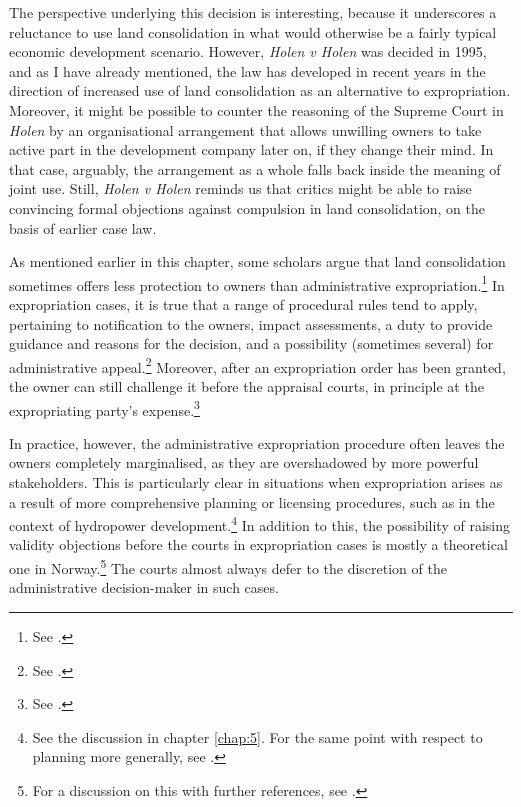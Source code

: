 The perspective underlying this decision is interesting, because it underscores a reluctance to use land consolidation in what would otherwise be a fairly typical economic development scenario. However, {\it Holen v Holen} was decided in 1995, and as I have already mentioned, the law has developed in recent years in the direction of increased use of land consolidation as an alternative to expropriation. Moreover, it might be possible to counter the reasoning of the Supreme Court in {\it Holen} by an organisational arrangement that allows unwilling owners to take active part in the development company later on, if they change their mind. In that case, arguably, the arrangement as a whole falls back inside the meaning of joint use. Still, {\it Holen v Holen} reminds us that critics might be able to raise convincing formal objections against compulsion in land consolidation, on the basis of earlier case law. 

As mentioned earlier in this chapter, some scholars argue that land consolidation sometimes offers less protection to owners than administrative expropriation.\footnote{See \cite[318-319]{stenseth07}.} In expropriation cases, it is true that a range of procedural rules tend to apply, pertaining to notification to the owners, impact assessments, a duty to provide guidance and reasons for the decision, and a possibility (sometimes several) for administrative appeal.\footnote{See \cite[377-382]{dyrkolbotn15b}.} Moreover, after an expropriation order has been granted, the owner can still challenge it before the appraisal courts, in principle at the expropriating party's expense.\footnote{See \cite[382-384]{dyrkolbotn15b}.}

In practice, however, the administrative expropriation procedure often leaves the owners completely marginalised, as they are overshadowed by more powerful stakeholders. This is particularly clear in situations when expropriation arises as a result of more comprehensive planning or licensing procedures, such as in the context of hydropower development.\footnote{See the discussion in chapter \ref{chap:5}. For the same point with respect to planning more generally, see \cite[376]{dyrkolbotn15b}.} In addition to this, the possibility of raising validity objections before the courts in expropriation cases is mostly a theoretical one in Norway.\footnote{For a discussion on this with further references, see \cite[384-386]{dyrkolbotn15}.} The courts almost always defer to the discretion of the administrative decision-maker in such cases.

